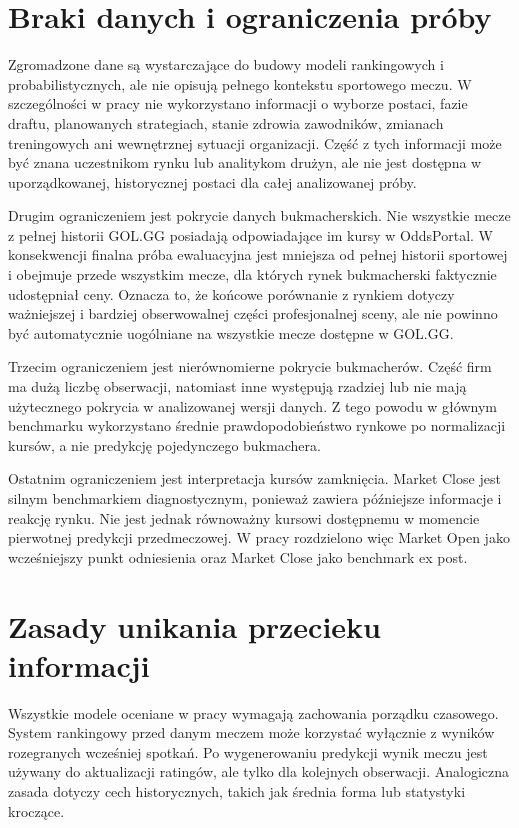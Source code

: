 \section{Braki danych i ograniczenia próby}

Zgromadzone dane są wystarczające do budowy modeli rankingowych i probabilistycznych, ale nie
opisują pełnego kontekstu sportowego meczu. W szczególności w pracy nie wykorzystano informacji o
wyborze postaci, fazie draftu, planowanych strategiach, stanie zdrowia zawodników, zmianach
treningowych ani wewnętrznej sytuacji organizacji. Część z tych informacji może być znana
uczestnikom rynku lub analitykom drużyn, ale nie jest dostępna w uporządkowanej, historycznej
postaci dla całej analizowanej próby.

Drugim ograniczeniem jest pokrycie danych bukmacherskich. Nie wszystkie mecze z pełnej historii
GOL.GG posiadają odpowiadające im kursy w OddsPortal. W konsekwencji finalna próba ewaluacyjna jest
mniejsza od pełnej historii sportowej i obejmuje przede wszystkim mecze, dla których rynek
bukmacherski faktycznie udostępniał ceny. Oznacza to, że końcowe porównanie z rynkiem dotyczy
ważniejszej i bardziej obserwowalnej części profesjonalnej sceny, ale nie powinno być automatycznie
uogólniane na wszystkie mecze dostępne w GOL.GG.

Trzecim ograniczeniem jest nierównomierne pokrycie bukmacherów. Część firm ma dużą liczbę
obserwacji, natomiast inne występują rzadziej lub nie mają użytecznego pokrycia w analizowanej
wersji danych. Z tego powodu w głównym benchmarku wykorzystano średnie prawdopodobieństwo rynkowe po
normalizacji kursów, a nie predykcję pojedynczego bukmachera.

Ostatnim ograniczeniem jest interpretacja kursów zamknięcia. Market Close jest silnym benchmarkiem
diagnostycznym, ponieważ zawiera późniejsze informacje i reakcję rynku. Nie jest jednak równoważny
kursowi dostępnemu w momencie pierwotnej predykcji przedmeczowej. W pracy rozdzielono więc Market
Open jako wcześniejszy punkt odniesienia oraz Market Close jako benchmark ex post.

\section{Zasady unikania przecieku informacji}

Wszystkie modele oceniane w pracy wymagają zachowania porządku czasowego. System rankingowy przed
danym meczem może korzystać wyłącznie z wyników rozegranych wcześniej spotkań. Po wygenerowaniu
predykcji wynik meczu jest używany do aktualizacji ratingów, ale tylko dla kolejnych obserwacji.
Analogiczna zasada dotyczy cech historycznych, takich jak średnia forma lub statystyki kroczące.

